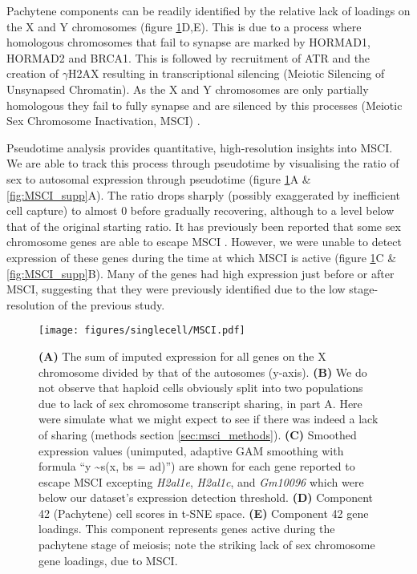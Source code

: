 Pachytene components can be readily identified by the relative lack of loadings on the X and Y chromosomes (figure \ref{fig:MSCI}D,E).
This is due to a process where homologous chromosomes that fail to synapse are marked by HORMAD1, HORMAD2 and BRCA1.
This is followed by recruitment of ATR and the creation of $\gamma$H2AX resulting in transcriptional silencing (Meiotic Silencing of Unsynapsed Chromatin).
As the X and Y chromosomes are only partially homologous they fail to fully synapse and are silenced by this processes (Meiotic Sex Chromosome Inactivation, MSCI) \parencite{Turner2007Meiotic, Turner2015Meiotic}.

Pseudotime analysis provides quantitative, high-resolution insights into MSCI.
We are able to track this process through pseudotime by visualising the ratio of sex to autosomal expression through pseudotime (figure \ref{fig:MSCI}A \& \ref{fig:MSCI_supp}A).
The ratio drops sharply (possibly exaggerated by inefficient cell capture) to almost 0 before gradually recovering, although to a level below that of the original starting ratio.
It has previously been reported that some sex chromosome genes are able to escape MSCI \parencite{daCruz2016Transcriptome, Soumillon2013Cellular}.
However, we were unable to detect expression of these genes during the time at which MSCI is active (figure \ref{fig:MSCI}C \& \ref{fig:MSCI_supp}B).
Many of the genes had high expression just before or after MSCI, suggesting that they were previously identified due to the low stage-resolution of the previous study.

\begin{figure}[H]
	\centering
	\texttt{[image: figures/singlecell/MSCI.pdf]}
	\caption[Meiotic Sex Chromosome Inactivation]{
		\textbf{(A)} The sum of imputed expression for all genes on the X chromosome divided by that of the autosomes (y-axis).
		\textbf{(B)} We do not observe that haploid cells obviously split into two populations due to lack of sex chromosome transcript sharing, in part A.
			Here were simulate what we might expect to see if there was indeed a lack of sharing (methods section \ref{sec:msci_methods}).
		\textbf{(C)} Smoothed expression values (unimputed, adaptive GAM smoothing with formula ``y \textasciitilde s(x, bs = ad)'') are shown for each gene reported to escape MSCI \parencite{daCruz2016Transcriptome} excepting \textit{H2al1e}, \textit{H2al1c}, and \textit{Gm10096} which were below our dataset's expression detection threshold.
		\textbf{(D)} Component 42 (Pachytene) cell scores in t-SNE space.
		\textbf{(E)} Component 42 gene loadings.
			This component represents genes active during the pachytene stage of meiosis; note the striking lack of sex chromosome gene loadings, due to MSCI.
	}
	\label{fig:MSCI}
\end{figure}

